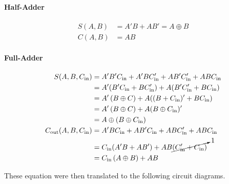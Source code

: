 \documentclass[11pt, letterpaper]{article} %
\begin{document}
\paragraph{Half-Adder}
\begin{align*}
S(A,B) &= A'B + AB' = A\oplus B \\
C(A,B) &= A B
\end{align*}

\paragraph{Full-Adder}
\begin{align*}
S(A,B,C_\mathrm{in}) &= A'B'C_\mathrm{in} + A'BC_\mathrm{in}' + AB'C_\mathrm{in}' + ABC_\mathrm{in}\\
&= A'(B'C_\mathrm{in} + BC_\mathrm{in}') + A(B'C_\mathrm{in}' + BC_\mathrm{in})\\
&= A'\left(B \oplus C\right) +A((B + C_\mathrm{in})' +BC_\mathrm{in})\\
&= A'\left(B \oplus C\right) +A(B\oplus C_\mathrm{in})'\\
&= A \oplus (B \oplus C_\mathrm{in})\\
C_\mathrm{out}(A,B,C_\mathrm{in}) &= A'BC_\mathrm{in} + AB'C_\mathrm{in} + ABC_\mathrm{in}' + ABC_\mathrm{in}\\
&= C_\mathrm{in} (A'B + AB') + AB\cancelto{1}{(C_\mathrm{in}' + C_\mathrm{in})}\\
&= C_\mathrm{in}\left(A\oplus B\right) + AB
\end{align*}

These equation were then translated to the following circuit diagrams.
\end{document}
